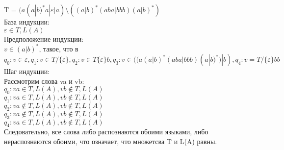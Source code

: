 \documentclass[12pt]{article}
\theoremstyle{definiton}
\theoremstyle{definition}
\theoremstyle{definition}
\let\epsilon\varepsilon
\begin{document}
	T = $ (a(a|b)^*a | \epsilon | a) \setminus ((a|b)^*(aba|bbb)(a|b)^*) $\\
	База индукции:\\ $\epsilon \in T, L(A)$\\
	Предположение индукции:\\
	$ v \in (a|b)^*$, такое, что в $q_0: v \in {\epsilon}, q_1: v \in T / \{\epsilon\}, q_2: v \in T \{\epsilon\} b, q_3: v \in ((a(a|b)^*(aba|bbb)(a|b)^*)|b), q_4: v = T / \{\epsilon\} bb $\\
	Шаг индукции:\\
	Рассмотрим слова va и vb:\\
	$q_0: va \in T, L(A), vb \notin T, L(A)$\\
	$q_1: va \in T, L(A), vb \notin T, L(A)$\\
	$q_2: va \notin T, L(A), vb \notin T, L(A)$\\
	$q_3: va \notin T, L(A), vb \notin T, L(A)$\\
	$q_4: va \in T, L(A), vb \notin T, L(A)$\\
	Следовательно, все слова либо распознаются обоими языками, либо нераспознаются обоими, что означает, что множетсва T и L(A) равны.
\end{document}
